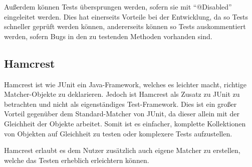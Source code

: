 Außerdem können Tests übersprungen werden, sofern sie mit \enquote{@Disabled} eingeleitet werden.
Dies hat einerseits Vorteile bei der Entwicklung, da so Tests schneller geprüft werden können, andererseits können so Tests auskommentiert werden, sofern Bugs in den zu testenden Methoden vorhanden sind.


\subsection{Hamcrest}

Hamcrest ist wie JUnit ein Java-Framework, welches es leichter macht, richtige Matcher-Objekte zu deklarieren.
Jedoch ist Hamcrest als Zusatz zu JUnit zu betrachten und nicht als eigenständiges Test-Framework.
Dies ist ein großer Vorteil gegenüber dem Standard-Matcher von JUnit, da dieser allein mit der Gleichheit der Objekte arbeitet.
Somit ist es einfacher, komplette Kollektionen von Objekten auf Gleichheit zu testen oder komplexere Tests aufzustellen.

Hamcrest erlaubt es dem Nutzer zusätzlich auch eigene Matcher zu erstellen, welche das Testen erheblich erleichtern können.

